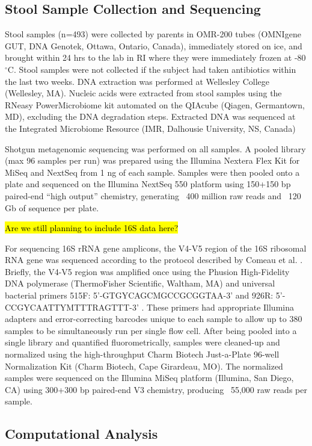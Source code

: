 \documentclass[a4paper]{article}
\begin{document}
\subsection*{Stool Sample Collection and Sequencing}

Stool samples (n=493) were collected by parents in OMR-200 tubes (OMNIgene GUT, DNA Genotek, Ottawa, Ontario, Canada),
immediately stored on ice, and brought within 24 hrs to the lab in RI where they were immediately frozen at -80 $^{\circ}$C.
Stool samples were not collected if the subject had taken antibiotics within the last two weeks.
DNA extraction was performed at Wellesley College (Wellesley, MA).
Nucleic acids were extracted from stool samples using the RNeasy PowerMicrobiome kit
automated on the QIAcube (Qiagen, Germantown, MD), excluding the DNA degradation steps.
Extracted DNA was sequenced at the Integrated Microbiome Resource (IMR, Dalhousie University, NS, Canada)

Shotgun metagenomic sequencing was performed on all samples.
A pooled library (max 96 samples per run) was prepared using the Illumina Nextera Flex Kit for MiSeq and NextSeq from 1 ng of each sample.
Samples were then pooled onto a plate and sequenced
on the Illumina NextSeq 550 platform using 150+150 bp paired-end “high output” chemistry,
generating ~400 million raw reads and ~120 Gb of sequence per plate.

\hl{Are we still planning to include 16S data here?}

For sequencing 16S rRNA gene amplicons,
the V4-V5 region of the 16S ribosomal RNA gene was sequenced according to the protocol
described by Comeau et al. \cite{Comeau2017-jg}.
Briefly, the V4-V5 region was amplified once using the Phusion High-Fidelity DNA polymerase
(ThermoFisher Scientific, Waltham, MA) and universal bacterial primers
515F: 5’-GTGYCAGCMGCCGCGGTAA-3’ and 926R: 5’-CCGYCAATTYMTTTRAGTTT-3’ \cite{Parada2016-uz,Walters2016-fi}.
These primers had appropriate Illumina adapters and error-correcting barcodes unique to each sample
to allow up to 380 samples to be simultaneously run per single flow cell.
After being pooled into a single library and quantified fluorometrically,
samples were cleaned-up and normalized using the high-throughput Charm Biotech Just-a-Plate 96-well Normalization Kit (Charm Biotech, Cape Girardeau, MO).
The normalized samples were sequenced on the Illumina MiSeq platform (Illumina, San Diego, CA)
using 300+300 bp paired-end V3 chemistry, producing ~55,000 raw reads per sample.

\subsection*{Computational Analysis}
\end{document}
